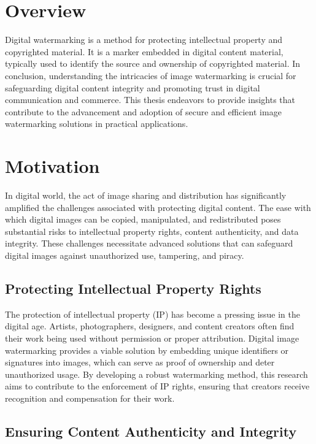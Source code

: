 \section{Overview}

Digital watermarking is a method for protecting intellectual property and copyrighted material. It is a marker embedded in digital content material, typically used to identify the source and ownership of copyrighted material. In conclusion, understanding the intricacies of image watermarking is crucial for safeguarding digital content integrity and promoting trust in digital communication and commerce. This thesis endeavors to provide insights that contribute to the advancement and adoption of secure and efficient image watermarking solutions in practical applications.

\section{Motivation}

In digital world, the act of image sharing and distribution has significantly amplified the challenges associated with protecting digital content. The ease with which digital images can be copied, manipulated, and redistributed poses substantial risks to intellectual property rights, content authenticity, and data integrity. These challenges necessitate advanced solutions that can safeguard digital images against unauthorized use, tampering, and piracy.

\subsection{Protecting Intellectual Property Rights}

The protection of intellectual property (IP) has become a pressing issue in the digital age. Artists, photographers, designers, and content creators often find their work being used without permission or proper attribution. Digital image watermarking provides a viable solution by embedding unique identifiers or signatures into images, which can serve as proof of ownership and deter unauthorized usage. By developing a robust watermarking method, this research aims to contribute to the enforcement of IP rights, ensuring that creators receive recognition and compensation for their work.

\subsection{Ensuring Content Authenticity and Integrity}

